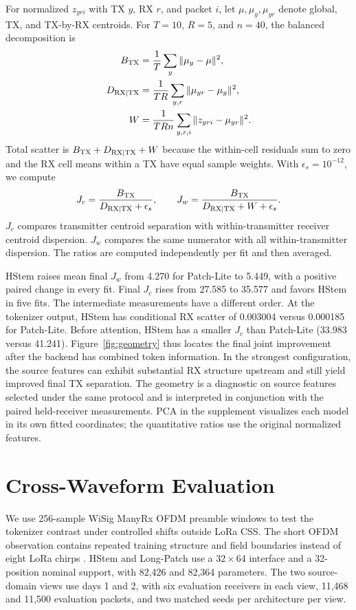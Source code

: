 \documentclass[journal]{IEEEtran}
\begin{document}
For normalized \(z_{yri}\) with TX \(y\), RX \(r\), and packet \(i\), let \(\mu,\mu_y,\mu_{yr}\) denote global, TX, and TX-by-RX centroids. For \(T=10\), \(R=5\), and \(n=40\), the balanced decomposition is
\begin{align}
 B_{\rm TX}&=\frac{1}{T}\sum_y\|\mu_y-\mu\|^2,\\
 D_{\rm RX|TX}&=\frac{1}{TR}\sum_{y,r}\|\mu_{yr}-\mu_y\|^2,\\
 W&=\frac{1}{TRn}\sum_{y,r,i}\|z_{yri}-\mu_{yr}\|^2 .
\end{align}
Total scatter is \(B_{\rm TX}+D_{\rm RX|TX}+W\) because the within-cell residuals sum to zero and the RX cell means within a TX have equal sample weights. With \(\epsilon_s=10^{-12}\), we compute
\begin{equation}
 J_c=\frac{B_{\rm TX}}{D_{\rm RX|TX}+\epsilon_s},\qquad
 J_w=\frac{B_{\rm TX}}{D_{\rm RX|TX}+W+\epsilon_s} .
\end{equation}
\(J_c\) compares transmitter centroid separation with within-transmitter receiver centroid dispersion. \(J_w\) compares the same numerator with all within-transmitter dispersion. The ratios are computed independently per fit and then averaged.


HStem raises mean final \(J_w\) from 4.270 for Patch-Lite to 5.449, with a positive paired change in every fit. Final \(J_c\) rises from 27.585 to 35.577 and favors HStem in five fits. The intermediate measurements have a different order. At the tokenizer output, HStem has conditional RX scatter of 0.003004 versus 0.000185 for Patch-Lite. Before attention, HStem has a smaller \(J_c\) than Patch-Lite (33.983 versus 41.241). Figure~\ref{fig:geometry} thus locates the final joint improvement after the backend has combined token information. In the strongest configuration, the source features can exhibit substantial RX structure upstream and still yield improved final TX separation. The geometry is a diagnostic on source features selected under the same protocol and is interpreted in conjunction with the paired held-receiver measurements. PCA in the supplement visualizes each model in its own fitted coordinates; the quantitative ratios use the original normalized features.

\section{Cross-Waveform Evaluation}
We use 256-sample WiSig ManyRx OFDM preamble windows to test the tokenizer contrast under controlled shifts outside LoRa CSS. The short OFDM observation contains repeated training structure and field boundaries instead of eight LoRa chirps \cite{hanna2022wisig,raychaudhuri2005orbit}. HStem and Long-Patch use a \(32\times64\) interface and a 32-position nominal support, with 82,426 and 82,364 parameters. The two source-domain views use days 1 and 2, with six evaluation receivers in each view, 11,468 and 11,500 evaluation packets, and two matched seeds per architecture per view.
\end{document}
